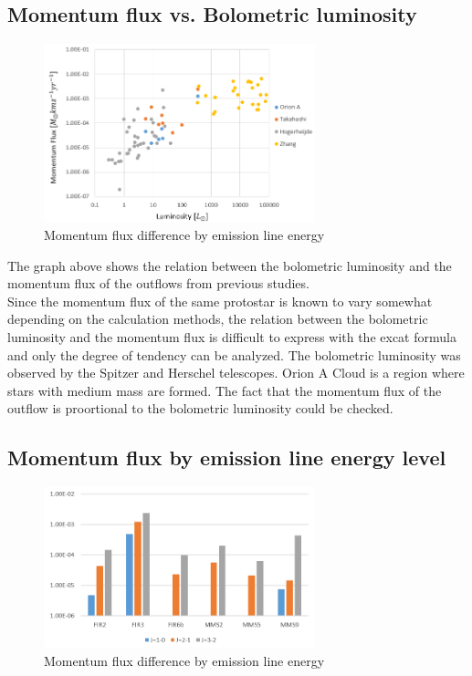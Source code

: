 \documentclass[twoside,11pt]{gshs_thesis}
\begin{document}
\subsection{Momentum flux vs. Bolometric luminosity}


\begin{figure}[h!]
	\centering
	\includegraphics[width=0.7\textwidth]{Luminosity.PNG}
	\caption{Momentum flux difference by emission line energy}
\end{figure}


The graph above shows the relation between the bolometric luminosity and the momentum flux of the outflows from previous studies.  \cite{Takahashi} \cite{Marel}\cite{Hogerheijde}\cite{Nakamura} \cite{Aso}  \cite{Zhang} \\ Since the momentum flux of the same protostar is known to vary somewhat depending on the calculation methods\cite{Marel}, the relation between the bolometric luminosity and the momentum flux is difficult to express with the excat formula and only the degree of tendency can be analyzed.
The bolometric luminosity was observed by the Spitzer and Herschel telescopes. Orion A Cloud is a region where stars with medium mass are formed. The fact that the momentum flux of the outflow is proortional to the bolometric luminosity could be checked.

\newpage

\subsection{Momentum flux by emission line energy level}

\begin{figure}[h!]
	\centering
	\includegraphics[width=0.7\textwidth]{J.PNG}
	\caption{Momentum flux difference by emission line energy}
\end{figure}
\end{document}
